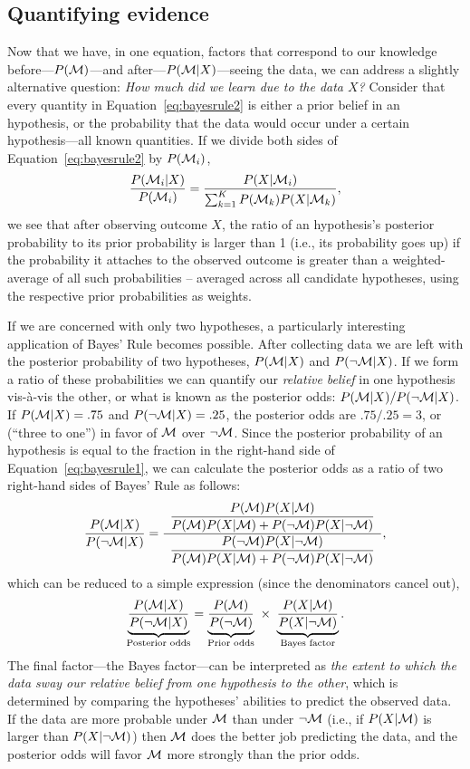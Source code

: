 \subsection*{Quantifying evidence}
Now that we have, in one equation, factors that correspond to our knowledge before---$P({\cal M})$---and after---$P({\cal M}|X)$---seeing the data, we can address a slightly alternative question: \emph{How much did we learn due to the data $X$?} Consider that every quantity in Equation~\ref{eq:bayesrule2} is either a prior belief in an hypothesis, or the probability that the data would occur under a certain hypothesis---all known quantities. If we divide both sides of Equation~\ref{eq:bayesrule2} by $P({\cal M}_i)$,
\begin{eqnarray}
\frac{P({\cal M}_i|X)}{P({\cal M}_i)} = \frac{P(X|{\cal M}_i)}{\sum_{k=1}^K P({\cal M}_k)P(X|{\cal M}_k)},
\end{eqnarray}
we see that after observing outcome $X$, the ratio of an hypothesis's posterior probability to its prior probability is larger than 1 (i.e., its probability goes up) if {the probability it attaches to the observed outcome is greater than a weighted-average of all such probabilities -- averaged across all candidate hypotheses, using the respective prior probabilities as weights.}

If we are concerned with only two hypotheses, a particularly interesting application of Bayes' Rule becomes possible. After collecting data we are left with the posterior probability of two hypotheses, $P({\cal M}|X)$ and $P(\neg{\cal M}|X)$. If we form a ratio of these probabilities we can quantify our \emph{relative belief} in one hypothesis vis-\`a-vis the other, or what is known as the posterior odds: $P({\cal M}|X)/P(\neg{\cal M}|X)$. If $P({\cal M}|X) = .75$ and $P(\neg{\cal M}|X) = .25$, the posterior odds are $.75/.25 = 3$, or  (``three to one'') in favor of ${\cal M}$ over $\neg{\cal M}$. Since the posterior probability of an hypothesis is equal to the fraction in the right-hand side of Equation~\ref{eq:bayesrule1}, we can calculate the posterior odds as a ratio of two right-hand sides of Bayes' Rule as follows: $$ \dfrac{P({\cal M}|X)}{P(\neg{\cal M}|X)} = \dfrac{\,\,\,\dfrac{P({\cal M})P(X|{\cal M})}{P({\cal M})P(X|{\cal M}) + P(\neg{{\cal M}})P(X|\neg{{\cal M}})}\,\,\,}{\dfrac{P(\neg{\cal M})P(X|\neg{\cal M})}{P({\cal M})P(X|{\cal M}) + P(\neg{{\cal M}})P(X|\neg{{\cal M}})}}, $$ which can be reduced to a simple expression (since the denominators cancel out),
\begin{equation}
\underbrace{\frac{P({\cal M}|X)} {P(\neg{\cal M}|X)}}_\text{Posterior odds} =
\underbrace{\frac{P({\cal M})}{P(\neg{\cal M})}}_\text{Prior odds} \ \times \
\underbrace{\frac{P(X|{\cal M})}{P(X|\neg{\cal M})}}_\text{Bayes factor}.\label{eq:bayesodds}
\end{equation}
The final factor---the Bayes factor---can be interpreted as \emph{the extent to which the data sway our relative belief from one hypothesis to the other}, which is determined by comparing the hypotheses' abilities to predict the observed data. If the data are more probable under ${\cal M}$ than under $\neg {\cal M}$ (i.e., if $P(X|{\cal M})$ is larger than $P(X|\neg {\cal M})$) then ${\cal M}$ does the better job predicting the data, and the posterior odds will favor ${\cal M}$ more strongly than the prior odds.


